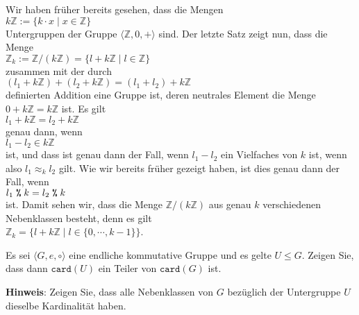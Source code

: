 \example
Wir haben fr\"{u}her bereits gesehen, dass die Mengen 
\\[0.2cm]
\hspace*{1.3cm}
$k\mathbb{Z} := \bigr\{ k \cdot x \mid x \in \mathbb{Z} \bigr\}$
\\[0.2cm]
Untergruppen der Gruppe $\langle \mathbb{Z}, 0, + \rangle$ sind.  Der letzte Satz zeigt nun, dass die Menge
\\[0.2cm]
\hspace*{1.3cm}
$\mathbb{Z}_k := \mathbb{Z}/(k\mathbb{Z}) = \bigl\{ l + k\mathbb{Z} \mid l \in \mathbb{Z} \}$
\\[0.2cm]
zusammen mit der durch
\\[0.2cm]
\hspace*{1.3cm}
$(l_1 + k\mathbb{Z}) + (l_2 + k\mathbb{Z}) = (l_1 + l_2) + k\mathbb{Z}$
\\[0.2cm]
definierten Addition eine Gruppe ist, deren neutrales Element die Menge $0 + k\mathbb{Z} = k\mathbb{Z}$ ist.
Es gilt
\\[0.2cm]
\hspace*{1.3cm}
$l_1 + k\mathbb{Z} = l_2 + k\mathbb{Z}$
\\[0.2cm]
genau dann, wenn
\\[0.2cm]
\hspace*{1.3cm}
$l_1 - l_2 \in k\mathbb{Z}$
\\[0.2cm]
ist, und dass ist genau dann der Fall, wenn $l_1 - l_2$ ein Vielfaches von $k$ ist, wenn also
$l_1 \approx_k l_2$ gilt.  Wie wir bereits fr\"{u}her gezeigt haben, ist dies genau dann der Fall, wenn
\\[0.2cm]
\hspace*{1.3cm}
$l_1 \;\texttt{\%}\; k = l_2 \;\texttt{\%}\; k$
\\[0.2cm]
ist.  Damit sehen wir, dass die Menge $\mathbb{Z}/(k\mathbb{Z})$ aus genau $k$ verschiedenen Nebenklassen besteht, denn
es gilt
\\[0.2cm]
\hspace*{1.3cm}
$\mathbb{Z}_k = \bigl\{ l + k\mathbb{Z} \mid l \in \{0, \cdots, k - 1\} \bigr\}$.
\vspace*{0.2cm}

\exercise
Es sei $\langle G, e, \circ \rangle$ eine endliche kommutative Gruppe und es gelte $U \leq G$.
Zeigen Sie, dass dann $\mathtt{card}(U)$ ein Teiler von $\mathtt{card}(G)$ ist. 
\vspace*{0.2cm}

\noindent
\textbf{Hinweis}: Zeigen Sie, dass alle Nebenklassen von $G$ bez\"{u}glich der Untergruppe $U$ dieselbe
Kardinalit\"{a}t haben.
\exend

